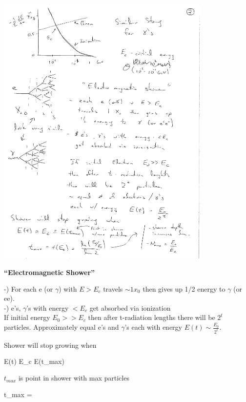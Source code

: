 {\begin{minipage}{0.5\textwidth}
\bc
\includegraphics[width=0.8\textwidth]{./EMShower.pdf}
\ec
\end{minipage}\hfill
\begin{minipage}{0.5\textwidth}
\bc
\textbf{``Electromagnetic Shower''}
\ec

-) For each e (or $\gamma$) with $E > E_c$ travels $\sim 1 x_0$ then gives up 1/2 energy to $\gamma$ (or ee).\\

-) e's, $\gamma$'s with energy $< E_c$ get absorbed via ionization\\

If initial energy $E_0 >> E_c$ then after t-radiation lengths there will be $2^t$ particles. 
Approximately equal e's and $\gamma$'s each with energy $E(t) \sim \frac{E_0 }{2^t}$.

\end{minipage} 

Shower will stop growing when 

\be
E(t) \simeq E_c \equiv E(t_{max})
\ee

$t_{max}$ is point in shower with max particles


\be
t_{max} = 
\ee

}
